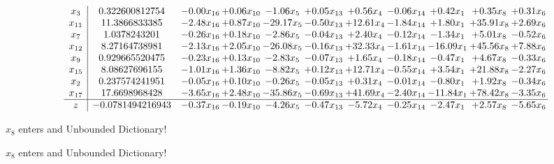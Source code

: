 \documentclass[9pt]{article}
\begin{document}
 \[\begin{array}{c| c c@{\hskip 2pt} c@{\hskip 2pt} c@{\hskip 2pt} c@{\hskip 2pt} c@{\hskip 2pt} c@{\hskip 2pt} c@{\hskip 2pt} c@{\hskip 2pt} c@{\hskip 2pt} }
 x_{3}   &  0.322600812754 & -0.00 x_{16} & +  0.06 x_{10} & -1.06 x_{5} & +  0.05 x_{13} & +  0.56 x_{4} & -0.06 x_{14} & +  0.42 x_{1} & +  0.35 x_{8} & +  0.31 x_{6}\\
 x_{11}   &  11.3866833385 & -2.48 x_{16} & +  0.87 x_{10} & -29.17 x_{5} & -0.50 x_{13} & + 12.61 x_{4} & -1.84 x_{14} & +  1.80 x_{1} & + 35.91 x_{8} & +  2.69 x_{6}\\
 x_{7}   &  1.0378243201 & -0.26 x_{16} & +  0.18 x_{10} & -2.86 x_{5} & -0.04 x_{13} & +  2.40 x_{4} & -0.12 x_{14} & -1.34 x_{1} & +  5.01 x_{8} & -0.52 x_{6}\\
 x_{12}   &  8.27164738981 & -2.13 x_{16} & +  2.05 x_{10} & -26.08 x_{5} & -0.16 x_{13} & + 32.33 x_{4} & -1.61 x_{14} & -16.09 x_{1} & + 45.56 x_{8} & +  7.88 x_{6}\\
 x_{9}   &  0.929665520475 & -0.23 x_{16} & +  0.13 x_{10} & -2.83 x_{5} & -0.07 x_{13} & +  1.65 x_{4} & -0.18 x_{14} & -0.47 x_{1} & +  4.67 x_{8} & -0.33 x_{6}\\
 x_{15}   &  8.08627696155 & -1.01 x_{16} & +  1.36 x_{10} & -8.82 x_{5} & +  0.12 x_{13} & + 12.71 x_{4} & -0.55 x_{14} & +  3.54 x_{1} & + 21.88 x_{8} & -2.27 x_{6}\\
 x_{2}   &  0.237574241951 & -0.05 x_{16} & +  0.10 x_{10} & -0.26 x_{5} & -0.05 x_{13} & +  0.31 x_{4} & -0.01 x_{14} & -0.80 x_{1} & +  1.92 x_{8} & -0.34 x_{6}\\
 x_{17}   &  17.6698968428 & -3.65 x_{16} & +  2.48 x_{10} & -35.86 x_{5} & -0.69 x_{13} & + 41.69 x_{4} & -2.40 x_{14} & -11.84 x_{1} & + 78.42 x_{8} & -3.35 x_{6}\\
\hline
z    &  -0.0781494216943 & -0.37 x_{16} & -0.19 x_{10} & -4.26 x_{5} & -0.47 x_{13} & -5.72 x_{4} & -0.25 x_{14} & -2.47 x_{1} & +  2.57 x_{8} & -5.65 x_{6}\\
\end{array}\]


 $ x_{8} $ enters and Unbounded Dictionary!


 $ x_{8} $ enters and Unbounded Dictionary!
\end{document}

